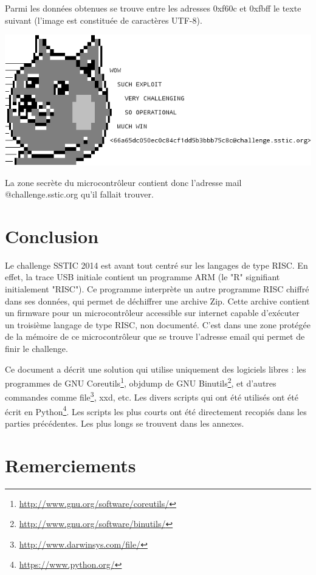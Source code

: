 \documentclass[a4paper,10pt]{article}
\begin{document}
Parmi les données obtenues se trouve entre les adresses 0xf60c et 0xfbff le texte suivant (l'image est constituée de caractères UTF-8).

\includegraphics[width=14cm]{final.png}

La zone secrète du microcontrôleur contient donc l'adresse mail @challenge.sstic.org qu'il fallait trouver.

\section{Conclusion}

Le challenge SSTIC 2014 est avant tout centré sur les langages de type RISC. En effet, la trace USB initiale contient un programme ARM (le "R" signifiant initialement "RISC"). Ce programme interprète un autre programme RISC chiffré dans ses données, qui permet de déchiffrer une archive Zip. Cette archive contient un firmware pour un microcontrôleur accessible sur internet capable d'exécuter un troisième langage de type RISC, non documenté. C'est dans une zone protégée de la mémoire de ce microcontrôleur que se trouve l'adresse email qui permet de finir le challenge.

Ce document a décrit une solution qui utilise uniquement des logiciels libres : les programmes de GNU Coreutils\footnote{\url{http://www.gnu.org/software/coreutils/}}, objdump de GNU Binutils\footnote{\url{http://www.gnu.org/software/binutils/}}, et d'autres commandes comme file\footnote{\url{http://www.darwinsys.com/file/}}, xxd, etc. Les divers scripts qui ont été utilisés ont été écrit en Python\footnote{\url{https://www.python.org/}}. Les scripts les plus courts ont été directement recopiés dans les parties précédentes. Les plus longs se trouvent dans les annexes.

\section{Remerciements}
\end{document}
